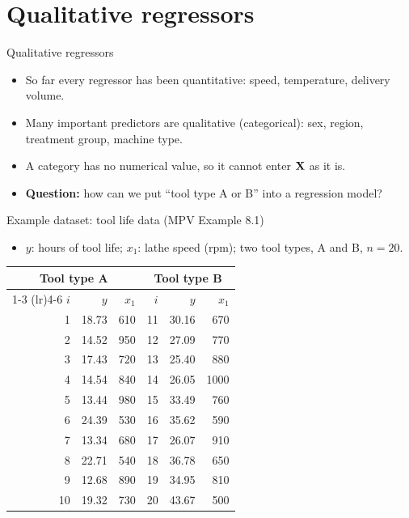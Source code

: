 \section{Qualitative regressors}


\begin{frame}{Qualitative regressors}
    \begin{itemize}
        \item So far every regressor has been quantitative: speed, temperature, delivery volume.
        \item Many important predictors are qualitative (categorical): sex, region, treatment group, machine type.
        \item A category has no numerical value, so it cannot enter $\mathbf{X}$ as it is.
        \item \textbf{Question:} how can we put ``tool type A or B'' into a regression model?
    \end{itemize}
\end{frame}


\begin{frame}{Example dataset: tool life data (MPV Example 8.1)}
    \begin{itemize}
        \item $y$: hours of tool life; $x_1$: lathe speed (rpm); two tool types, A and B, $n = 20$.
    \end{itemize}

    \vspace{0.5em}

    \begin{center}
        \begin{tabular}{rrr@{\hspace{3em}}rrr}
            \toprule
            \multicolumn{3}{c}{Tool type A} & \multicolumn{3}{c}{Tool type B} \\
            \cmidrule(lr){1-3} \cmidrule(lr){4-6}
            $i$ & $y$ & $x_1$ & $i$ & $y$ & $x_1$ \\
            \midrule
            1  & 18.73 & 610  & 11 & 30.16 & 670  \\
            2  & 14.52 & 950  & 12 & 27.09 & 770  \\
            3  & 17.43 & 720  & 13 & 25.40 & 880  \\
            4  & 14.54 & 840  & 14 & 26.05 & 1000 \\
            5  & 13.44 & 980  & 15 & 33.49 & 760  \\
            6  & 24.39 & 530  & 16 & 35.62 & 590  \\
            7  & 13.34 & 680  & 17 & 26.07 & 910  \\
            8  & 22.71 & 540  & 18 & 36.78 & 650  \\
            9  & 12.68 & 890  & 19 & 34.95 & 810  \\
            10 & 19.32 & 730  & 20 & 43.67 & 500  \\
            \bottomrule
        \end{tabular}
    \end{center}
\end{frame}


